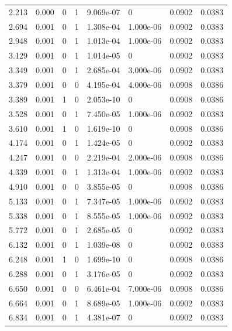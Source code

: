 \documentclass[preview]{standalone}
\begin{document}
{{\begin{tabular}{L{1.2cm}C{1.2cm} C{0.3cm}C{0.5cm} C{1.4cm}C{1.4cm} C{1.4cm}C{1.4cm}}
  2.213  &  0.000  & 0     &  1 &  9.069e-07  & 0  & 0.0902 &  0.0383   \\ 
  2.694  &  0.001  & 0     &  1 &  1.308e-04  & 1.000e-06  & 0.0902 &  0.0383   \\ 
  2.948  &  0.001  & 0     &  1 &  1.013e-04  & 1.000e-06  & 0.0902 &  0.0383   \\ 
  3.129  &  0.001  & 0     &  1 &  1.014e-05  & 0  & 0.0902 &  0.0383   \\ 
  3.349  &  0.001  & 0     &  1 &  2.685e-04  & 3.000e-06  & 0.0902 &  0.0383   \\ 
  3.379  &  0.001  & 0     &  0 &  4.195e-04  & 4.000e-06  & 0.0908 &  0.0386   \\ 
  3.389  &  0.001  & 1     &  0 &  2.053e-10  & 0  & 0.0908 &  0.0386   \\ 
  3.528  &  0.001  & 0     &  1 &  7.450e-05  & 1.000e-06  & 0.0902 &  0.0383   \\ 
  3.610  &  0.001  & 1     &  0 &  1.619e-10  & 0  & 0.0908 &  0.0386   \\ 
  4.174  &  0.001  & 0     &  1 &  1.424e-05  & 0  & 0.0902 &  0.0383   \\ 
  4.247  &  0.001  & 0     &  0 &  2.219e-04  & 2.000e-06  & 0.0908 &  0.0386   \\ 
  4.339  &  0.001  & 0     &  1 &  1.313e-04  & 1.000e-06  & 0.0902 &  0.0383   \\ 
  4.910  &  0.001  & 0     &  0 &  3.855e-05  & 0  & 0.0908 &  0.0386   \\ 
  5.133  &  0.001  & 0     &  1 &  7.347e-05  & 1.000e-06  & 0.0902 &  0.0383   \\ 
  5.338  &  0.001  & 0     &  1 &  8.555e-05  & 1.000e-06  & 0.0902 &  0.0383   \\ 
  5.772  &  0.001  & 0     &  1 &  2.685e-05  & 0  & 0.0902 &  0.0383   \\ 
  6.132  &  0.001  & 0     &  1 &  1.039e-08  & 0  & 0.0902 &  0.0383   \\ 
  6.248  &  0.001  & 1     &  0 &  1.699e-10  & 0  & 0.0908 &  0.0386   \\ 
  6.288  &  0.001  & 0     &  1 &  3.176e-05  & 0  & 0.0902 &  0.0383   \\ 
  6.650  &  0.001  & 0     &  0 &  6.461e-04  & 7.000e-06  & 0.0908 &  0.0386   \\ 
  6.664  &  0.001  & 0     &  1 &  8.689e-05  & 1.000e-06  & 0.0902 &  0.0383   \\ 
  6.834  &  0.001  & 0     &  1 &  4.381e-07  & 0  & 0.0902 &  0.0383   \\ 

\end{tabular}}}
\end{document}
